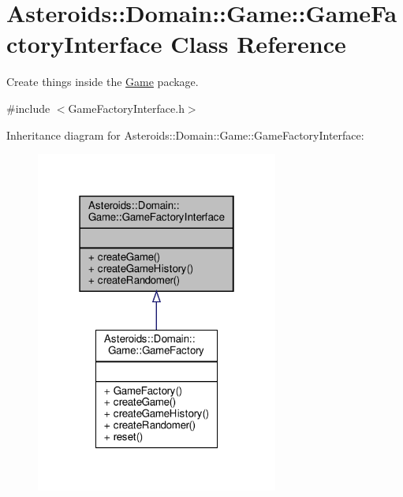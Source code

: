 \hypertarget{classAsteroids_1_1Domain_1_1Game_1_1GameFactoryInterface}{}\section{Asteroids\+:\+:Domain\+:\+:Game\+:\+:Game\+Factory\+Interface Class Reference}
\label{classAsteroids_1_1Domain_1_1Game_1_1GameFactoryInterface}


Create things inside the \hyperlink{classAsteroids_1_1Domain_1_1Game_1_1Game}{Game} package.  




{\ttfamily \#include $<$Game\+Factory\+Interface.\+h$>$}



Inheritance diagram for Asteroids\+:\+:Domain\+:\+:Game\+:\+:Game\+Factory\+Interface\+:\nopagebreak
\begin{figure}[H]
\begin{center}
\leavevmode
\includegraphics[width=226pt]{classAsteroids_1_1Domain_1_1Game_1_1GameFactoryInterface__inherit__graph}
\end{center}
\end{figure}


